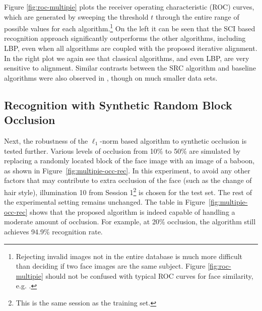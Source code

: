 Figure \ref{fig:roc-multipie} plots the receiver operating characteristic (ROC)
curves, which are generated by sweeping the threshold $t$ through the entire
range of possible values for each algorithm.\footnote{Rejecting invalid images
not in the entire database is much more difficult than deciding if two face
images are the same subject. Figure \ref{fig:roc-multipie} should not be
confused with typical ROC curves for face similarity, e.g.
\cite{PhillipsP2007}.} On the left it can be seen that the SCI based
recognition approach significantly outperforms the other algorithms, including
LBP, even when all algorithms are coupled with the proposed iterative
alignment.  In the right plot we again see that classical algorithms, and even
LBP, are very sensitive to alignment.  Similar contrasts between the SRC
algorithm and baseline algorithms were also observed in \cite{Wright2009-PAMI},
though on much smaller data sets.

\subsection{Recognition with Synthetic Random Block Occlusion}

Next, the robustness of the $\ell_1$-norm based
algorithm to synthetic occlusion is tested further. 
Various levels of
occlusion from 10\% to 50\% are simulated by replacing a randomly located
block of the face image with an image of a baboon, as shown in
Figure~\ref{fig:multipie-occ-rec}. In this experiment, to avoid
any other factors that may contribute to extra occlusion of the
face (such as the change of hair style), illumination
10 from Session 1\footnote{This is the same session as the
training set.} is chosen for the test set. The rest of the experimental setting
remains unchanged. The table in
Figure~\ref{fig:multipie-occ-rec} shows that the proposed algorithm is
indeed capable of handling a moderate amount of occlusion. For
example, at 20\% occlusion, the algorithm still achieves 94.9\%
recognition rate.


